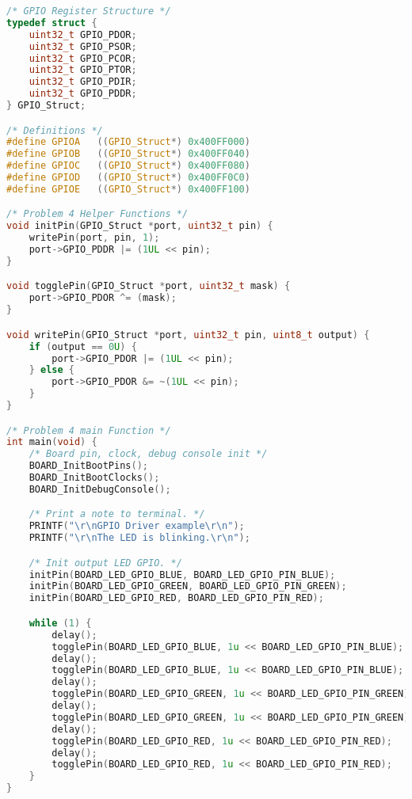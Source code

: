 \begin{lstlisting}[language=c,caption=Problem 4, label=list:p4]
/* GPIO Register Structure */
typedef struct {
    uint32_t GPIO_PDOR;
    uint32_t GPIO_PSOR;
    uint32_t GPIO_PCOR;
    uint32_t GPIO_PTOR;
    uint32_t GPIO_PDIR;
    uint32_t GPIO_PDDR;
} GPIO_Struct;

/* Definitions */
#define GPIOA   ((GPIO_Struct*) 0x400FF000)
#define GPIOB   ((GPIO_Struct*) 0x400FF040)
#define GPIOC   ((GPIO_Struct*) 0x400FF080)
#define GPIOD   ((GPIO_Struct*) 0x400FF0C0)
#define GPIOE   ((GPIO_Struct*) 0x400FF100)

/* Problem 4 Helper Functions */
void initPin(GPIO_Struct *port, uint32_t pin) {
    writePin(port, pin, 1);
    port->GPIO_PDDR |= (1UL << pin);
}

void togglePin(GPIO_Struct *port, uint32_t mask) {
    port->GPIO_PDOR ^= (mask);
}

void writePin(GPIO_Struct *port, uint32_t pin, uint8_t output) {
    if (output == 0U) {
        port->GPIO_PDOR |= (1UL << pin);
    } else {
        port->GPIO_PDOR &= ~(1UL << pin);
    }
}

/* Problem 4 main Function */
int main(void) {
    /* Board pin, clock, debug console init */
    BOARD_InitBootPins();
    BOARD_InitBootClocks();
    BOARD_InitDebugConsole();

    /* Print a note to terminal. */
    PRINTF("\r\nGPIO Driver example\r\n");
    PRINTF("\r\nThe LED is blinking.\r\n");

    /* Init output LED GPIO. */
    initPin(BOARD_LED_GPIO_BLUE, BOARD_LED_GPIO_PIN_BLUE);
    initPin(BOARD_LED_GPIO_GREEN, BOARD_LED_GPIO_PIN_GREEN);
    initPin(BOARD_LED_GPIO_RED, BOARD_LED_GPIO_PIN_RED);

    while (1) {
        delay();
        togglePin(BOARD_LED_GPIO_BLUE, 1u << BOARD_LED_GPIO_PIN_BLUE);
        delay();
        togglePin(BOARD_LED_GPIO_BLUE, 1u << BOARD_LED_GPIO_PIN_BLUE);
        delay();
        togglePin(BOARD_LED_GPIO_GREEN, 1u << BOARD_LED_GPIO_PIN_GREEN);
        delay();
        togglePin(BOARD_LED_GPIO_GREEN, 1u << BOARD_LED_GPIO_PIN_GREEN);
        delay();
        togglePin(BOARD_LED_GPIO_RED, 1u << BOARD_LED_GPIO_PIN_RED);
        delay();
        togglePin(BOARD_LED_GPIO_RED, 1u << BOARD_LED_GPIO_PIN_RED);
    }
}
\end{lstlisting}